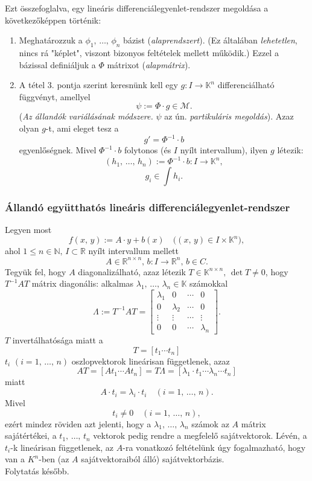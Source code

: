 \documentclass{article}
\newcommand{\R}{\mathbb{R}}
\newcommand{\N}{\mathbb{N}}
\newcommand{\K}{\mathbb{K}}
\begin{document}
	Ezt összefoglalva, egy lineáris differenciálegyenlet-rendszer megoldása a következőképpen történik:
	\begin{enumerate}
		\item Meghatározzuk a $\phi_1, \, \dots, \, \phi_n$ bázist (\textit{alaprendszert}). (Ez általában \textit{lehetetlen}, nincs rá "képlet", viszont bizonyos feltételek mellett működik.) Ezzel a bázissal definiáljuk a $\Phi$ mátrixot (\textit{alapmátrix}).
		\item A tétel 3. pontja szerint keresnünk kell egy $g : I \to \K^n$ differenciálható függvényt, amellyel
		\[
			\psi := \Phi \cdot g \in \mathcal{M}.
		\]
		(\textit{Az állandók variálásának módszere.} $\psi$ az ún. \textit{partikuláris megoldás}). Azaz olyan $g$-t, ami eleget tesz a
		\[
			g' = \Phi^{-1} \cdot b
		\]
		egyenlőségnek. Mivel $\Phi^{-1} \cdot b$ folytonos (és $I$ nyílt intervallum), ilyen $g$ létezik:
		\[	
			(h_1, \, \dots, \, h_n) := \Phi^{-1} \cdot b : I \to \K^n,
		\]
		\[
			g_i \in \int h_i.
		\]	
	\end{enumerate}
	
	\subsubsection{Állandó együtthatós lineáris differenciálegyenlet-rendszer}
	Legyen most
	\[
		f(x, \, y) := A \cdot y + b(x) \quad \big( (x, \, y) \in I \times \K^n \big),
	\]
	ahol $1 \leq n \in \N, \, I \subset \R$ nyílt intervallum mellett
	\[
		A \in \R^{n \times n}, \, b : I \to \R^n, \, b \in C.
	\]
	Tegyük fel, hogy $A$ diagonalizálható, azaz létezik $T \in \K^{n \times n}, \, \det T \neq 0$, hogy $T^{-1}AT$ mátrix diagonális: alkalmas $\lambda_1, \, \dots, \, \lambda_n \in \K$ számokkal
	\[
		\Lambda := T^{-1}AT = \begin{bmatrix}
			\lambda_1 & 0 & \cdots & 0 \\
			0 & \lambda_2 & \cdots & 0 \\
			\vdots & \vdots & \cdots & \vdots \\
			0 & 0 & \cdots & \lambda_n
		\end{bmatrix}.
	\]
	$T$ invertálhatósága miatt a
	\[
		 T = [t_1 \cdots t_n]
	\]
	$t_i$ $(i=1, \, \dots, \, n)$ oszlopvektorok lineárisan függetlenek, azaz
	\[
		AT = [At_1 \cdots At_n] = T\Lambda = [\lambda_1 \cdot t_1 \cdots \lambda_n \cdots t_n]
	\]
	miatt
	\[
		A \cdot t_i = \lambda_i \cdot t_i \quad (i = 1, \, \dots, \, n).
	\]
	Mivel
	\[
		t_i \neq 0 \quad (i = 1, \, \dots, \, n),
	\]
	ezért mindez röviden azt jelenti, hogy a $\lambda_1, \, \dots, \, \lambda_n$ számok az $A$ mátrix sajátértékei, a $t_1, \, \dots, \, t_n$ vektorok pedig rendre a megfelelő sajátvektorok. Lévén, a $t_i$-k lineárisan függetlenek, az $A$-ra vonatkozó feltételünk úgy fogalmazható, hogy van a $K^n$-ben (az $A$ sajátvektoraiból álló) sajátvektorbázis.\\

	Folytatás később.
\end{document}
